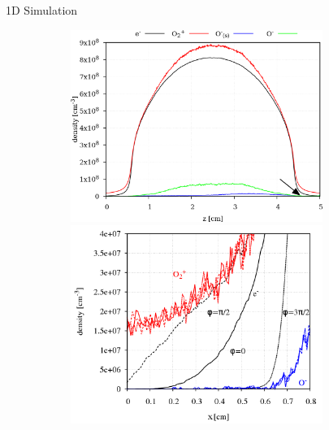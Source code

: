 \documentclass{beamer}
\begin{document}
		\begin{frame}{1D Simulation}
			\begin{figure}
				\begin{subfigure}{0.49\textwidth}
					\begin{overprint}
						\includegraphics[width=0.9\textwidth]
										{figures/results/1D/densities.png}
						\onslide<2>\includegraphics[width=0.9\textwidth]
										{figures/results/1D/prs_ne_dens.png}
					\end{overprint}
				\end{subfigure}
				\begin{subfigure}{0.49\textwidth}
					\begin{overprint}

\end{overprint}
\end{subfigure}
\end{figure}
\end{frame}
\end{document}
